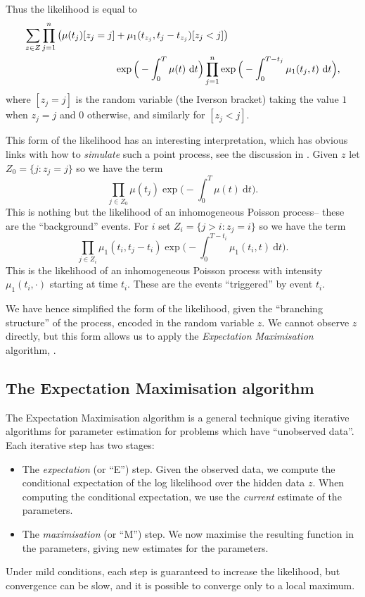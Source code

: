 \documentclass[twoside,a4paper]{article}
\theoremstyle{plain}
\theoremstyle{definition}
\newcommand{\rd}{\textrm{d}}
\begin{document}
Thus the likelihood is equal to
\begin{align}
\sum_{z\in Z} \prod_{j=1}^n \big( \mu(t_j)[z_j=j] &+ \mu_1(t_{z_j},t_j - t_{z_j}) [z_j<j] \big)
\notag \\ &
\exp\Big(-\int_0^T \mu(t) \ \rd t\Big) \prod_{j=1}^n\exp\Big(-\int_{0}^{T-t_j} \mu_1(t_j, t) \ \rd t\Big), \label{eq:one}
\end{align}
where $[z_j=j]$ is the random variable (the Iverson bracket) taking the value $1$ when
$z_j=j$ and $0$ otherwise, and similarly for $[z_j<j]$.

This form of the likelihood has an interesting interpretation, which has obvious links with how
to \emph{simulate} such a point process, see the discussion in \cite{mr, mr1}.
Given $z$ let $Z_0 = \{ j : z_j=j \}$ so we have the term
\[ \prod_{j\in Z_0} \mu(t_j) \exp\Big(-\int_0^T \mu(t) \ \rd t\Big). \]
This is nothing but the likelihood of an inhomogeneous Poisson process-- these are the
``background'' events.  For $i$ set $Z_i = \{ j > i : z_j=i \}$ so we have the term
\[ \prod_{j\in Z_i} \mu_1(t_i,t_j - t_i)\exp\Big(-\int_{0}^{T-t_i} \mu_1(t_i, t) \ \rd t\Big). \]
This is the likelihood of an inhomogeneous Poisson process with intensity $\mu_1(t_i,\cdot)$
starting at time $t_i$.  These are the events ``triggered'' by event $t_i$.

We have hence simplified the form of the likelihood, given the ``branching structure'' of
the process, encoded in the random variable $z$.  We cannot observe $z$ directly, but this form
allows us to apply the \emph{Expectation Maximisation} algorithm, \cite{mk}.


\subsection{The Expectation Maximisation algorithm}\label{app:em}

The Expectation Maximisation algorithm is a general technique giving iterative algorithms
for parameter estimation for problems which have ``unobserved data''.  Each iterative step
has two stages:
\begin{itemize}
\item The \emph{expectation} (or ``E'') step.  Given the observed data, we compute the
conditional expectation of the log likelihood over the hidden data $z$.  When computing the
conditional expectation, we use the \emph{current} estimate of the parameters.
\item The \emph{maximisation} (or ``M'') step.  We now maximise the resulting function
in the parameters, giving new estimates for the parameters.
\end{itemize}
Under mild conditions, each step is guaranteed to increase the likelihood, but convergence
can be slow, and it is possible to converge only to a local maximum.
\end{document}
